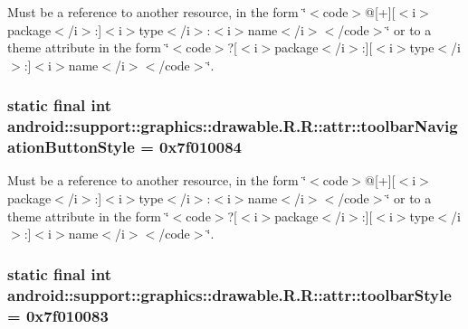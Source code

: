 Must be a reference to another resource, in the form \char`\"{}$<$code$>$@\mbox{[}+\mbox{]}\mbox{[}$<$i$>$package$<$/i$>$:\mbox{]}$<$i$>$type$<$/i$>$:$<$i$>$name$<$/i$>$$<$/code$>$\char`\"{} or to a theme attribute in the form \char`\"{}$<$code$>$?\mbox{[}$<$i$>$package$<$/i$>$:\mbox{]}\mbox{[}$<$i$>$type$<$/i$>$:\mbox{]}$<$i$>$name$<$/i$>$$<$/code$>$\char`\"{}. \hypertarget{classandroid_1_1support_1_1graphics_1_1drawable_1_1_r_1_1attr_e5baee99e50aee54ca21d2f97f470d17}{
\subsubsection[{toolbarNavigationButtonStyle}]{\setlength{\rightskip}{0pt plus 5cm}static final int android::support::graphics::drawable.R.R::attr::toolbarNavigationButtonStyle = 0x7f010084}}
\label{classandroid_1_1support_1_1graphics_1_1drawable_1_1_r_1_1attr_e5baee99e50aee54ca21d2f97f470d17}


Must be a reference to another resource, in the form \char`\"{}$<$code$>$@\mbox{[}+\mbox{]}\mbox{[}$<$i$>$package$<$/i$>$:\mbox{]}$<$i$>$type$<$/i$>$:$<$i$>$name$<$/i$>$$<$/code$>$\char`\"{} or to a theme attribute in the form \char`\"{}$<$code$>$?\mbox{[}$<$i$>$package$<$/i$>$:\mbox{]}\mbox{[}$<$i$>$type$<$/i$>$:\mbox{]}$<$i$>$name$<$/i$>$$<$/code$>$\char`\"{}. \hypertarget{classandroid_1_1support_1_1graphics_1_1drawable_1_1_r_1_1attr_9b568116e22fd4225dcc42d7fdf3f156}{
\subsubsection[{toolbarStyle}]{\setlength{\rightskip}{0pt plus 5cm}static final int android::support::graphics::drawable.R.R::attr::toolbarStyle = 0x7f010083}}
\label{classandroid_1_1support_1_1graphics_1_1drawable_1_1_r_1_1attr_9b568116e22fd4225dcc42d7fdf3f156}


